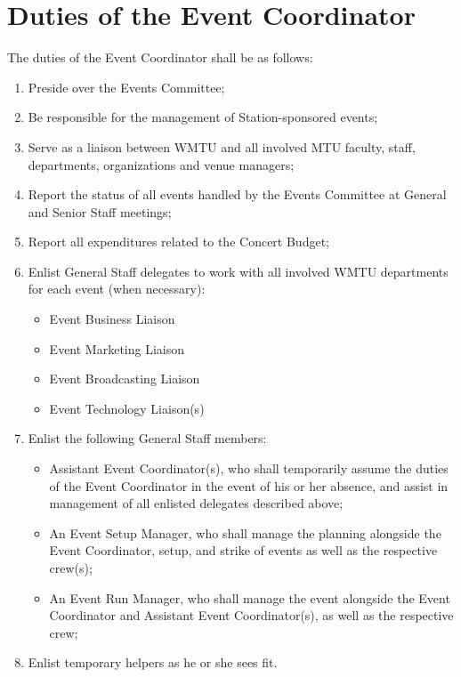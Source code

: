 \documentclass[12pt]{constitution}
\begin{document}
\section{​Duties of the Event Coordinator}
The duties of the Event Coordinator shall be as follows:
\begin{enumerate}
\item Preside over the Events Committee;
\item Be responsible for the management of Station-sponsored events;
\item Serve as a liaison between WMTU and all involved MTU faculty, staff, departments, organizations and venue managers;
\item Report the status of all events handled by the Events Committee at General and Senior Staff meetings;
\item Report all expenditures related to the Concert Budget;
\item Enlist General Staff delegates to work with all involved WMTU departments for each event (when necessary):
\begin{itemize}
\item Event Business Liaison
\item Event Marketing Liaison
\item Event Broadcasting Liaison
\item Event Technology Liaison(s)
\end{itemize}
\item Enlist the following General Staff members:
\begin{itemize}
\item Assistant Event Coordinator(s), who shall temporarily assume the duties of the Event Coordinator in the event of his or her absence, and assist in management of all enlisted delegates described above;
\item An Event Set­up Manager, who shall manage the planning alongside the Event Coordinator, set­up, and strike of events as well as the respective crew(s);
\item An Event Run Manager, who shall manage the event alongside the Event Coordinator and Assistant Event Coordinator(s), as well as the respective crew;
\end{itemize}
\item Enlist temporary helpers as he or she sees fit.
\end{enumerate}


\end{document}
